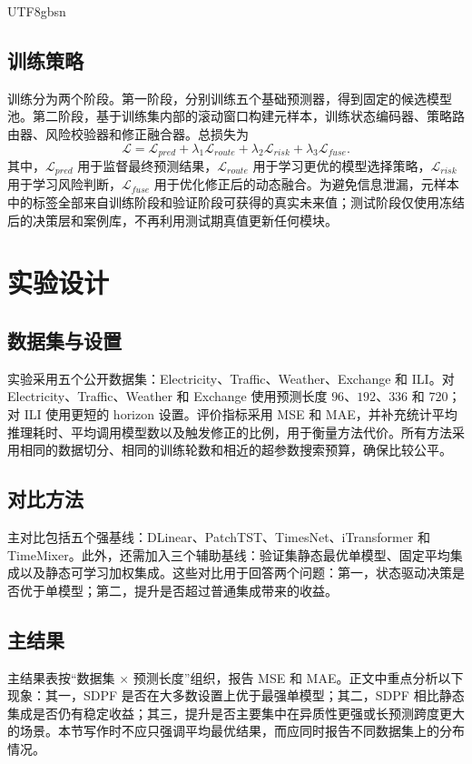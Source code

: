 \documentclass[journal,twoside,web]{ieeecolor}
\begin{document}
\begin{CJK*}{UTF8}{gbsn}
\subsection{训练策略}
训练分为两个阶段。第一阶段，分别训练五个基础预测器，得到固定的候选模型池。第二阶段，基于训练集内部的滚动窗口构建元样本，训练状态编码器、策略路由器、风险校验器和修正融合器。总损失为
\begin{equation}
\mathcal{L}=\mathcal{L}_{pred}+\lambda_1\mathcal{L}_{route}+\lambda_2\mathcal{L}_{risk}+\lambda_3\mathcal{L}_{fuse}.
\label{eq:loss}
\end{equation}
其中，$\mathcal{L}_{pred}$ 用于监督最终预测结果，$\mathcal{L}_{route}$ 用于学习更优的模型选择策略，$\mathcal{L}_{risk}$ 用于学习风险判断，$\mathcal{L}_{fuse}$ 用于优化修正后的动态融合。为避免信息泄漏，元样本中的标签全部来自训练阶段和验证阶段可获得的真实未来值；测试阶段仅使用冻结后的决策层和案例库，不再利用测试期真值更新任何模块。

\section{实验设计}
\subsection{数据集与设置}
实验采用五个公开数据集：Electricity、Traffic、Weather、Exchange 和 ILI。对 Electricity、Traffic、Weather 和 Exchange 使用预测长度 $96$、$192$、$336$ 和 $720$；对 ILI 使用更短的 horizon 设置。评价指标采用 MSE 和 MAE，并补充统计平均推理耗时、平均调用模型数以及触发修正的比例，用于衡量方法代价。所有方法采用相同的数据切分、相同的训练轮数和相近的超参数搜索预算，确保比较公平。

\subsection{对比方法}
主对比包括五个强基线：DLinear、PatchTST、TimesNet、iTransformer 和 TimeMixer。此外，还需加入三个辅助基线：验证集静态最优单模型、固定平均集成以及静态可学习加权集成。这些对比用于回答两个问题：第一，状态驱动决策是否优于单模型；第二，提升是否超过普通集成带来的收益。

\subsection{主结果}
主结果表按“数据集 $\times$ 预测长度”组织，报告 MSE 和 MAE。正文中重点分析以下现象：其一，SDPF 是否在大多数设置上优于最强单模型；其二，SDPF 相比静态集成是否仍有稳定收益；其三，提升是否主要集中在异质性更强或长预测跨度更大的场景。本节写作时不应只强调平均最优结果，而应同时报告不同数据集上的分布情况。


\end{CJK*}
\end{document}
